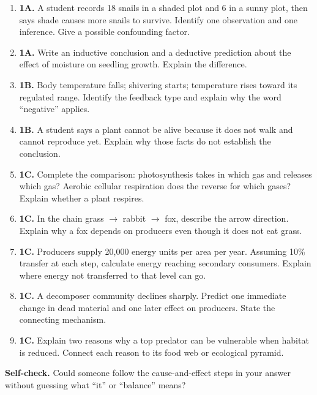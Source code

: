 \documentclass[11pt,letterpaper]{article}
\begin{document}
\begin{enumerate}
\item \textbf{1A.} A student records 18 snails in a shaded plot and 6 in a sunny plot, then says shade causes more snails to survive. Identify one observation and one inference. Give a possible confounding factor.
\item \textbf{1A.} Write an inductive conclusion and a deductive prediction about the effect of moisture on seedling growth. Explain the difference.
\item \textbf{1B.} Body temperature falls; shivering starts; temperature rises toward its regulated range. Identify the feedback type and explain why the word ``negative'' applies.
\item \textbf{1B.} A student says a plant cannot be alive because it does not walk and cannot reproduce yet. Explain why those facts do not establish the conclusion.
\item \textbf{1C.} Complete the comparison: photosynthesis takes in which gas and releases which gas? Aerobic cellular respiration does the reverse for which gases? Explain whether a plant respires.
\item \textbf{1C.} In the chain grass $\to$ rabbit $\to$ fox, describe the arrow direction. Explain why a fox depends on producers even though it does not eat grass.
\item \textbf{1C.} Producers supply 20,000 energy units per area per year. Assuming 10\% transfer at each step, calculate energy reaching secondary consumers. Explain where energy not transferred to that level can go.
\item \textbf{1C.} A decomposer community declines sharply. Predict one immediate change in dead material and one later effect on producers. State the connecting mechanism.
\item \textbf{1C.} Explain two reasons why a top predator can be vulnerable when habitat is reduced. Connect each reason to its food web or ecological pyramid.
\end{enumerate}
\vfill
\textbf{Self-check.} Could someone follow the cause-and-effect steps in your answer without guessing what ``it'' or ``balance'' means?
\end{document}
